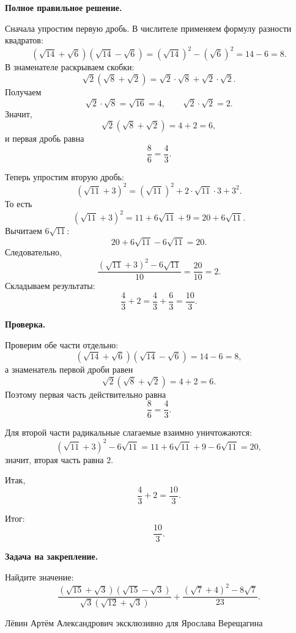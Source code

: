 \documentclass[12pt,a4paper]{article}
\begin{document}
\textbf{Полное правильное решение.}

Сначала упростим первую дробь. В числителе применяем формулу разности квадратов:
\[
(\sqrt{14}+\sqrt6)(\sqrt{14}-\sqrt6)
=
(\sqrt{14})^2-(\sqrt6)^2
=
14-6
=
8.
\]
В знаменателе раскрываем скобки:
\[
\sqrt2(\sqrt8+\sqrt2)
=
\sqrt2\cdot\sqrt8+\sqrt2\cdot\sqrt2.
\]
Получаем
\[
\sqrt2\cdot\sqrt8=\sqrt{16}=4,
\qquad
\sqrt2\cdot\sqrt2=2.
\]
Значит,
\[
\sqrt2(\sqrt8+\sqrt2)=4+2=6,
\]
и первая дробь равна
\[
\frac86=\frac43.
\]

Теперь упростим вторую дробь:
\[
(\sqrt{11}+3)^2
=
(\sqrt{11})^2+2\cdot\sqrt{11}\cdot3+3^2.
\]
То есть
\[
(\sqrt{11}+3)^2
=
11+6\sqrt{11}+9
=
20+6\sqrt{11}.
\]
Вычитаем $6\sqrt{11}$:
\[
20+6\sqrt{11}-6\sqrt{11}=20.
\]
Следовательно,
\[
\frac{(\sqrt{11}+3)^2-6\sqrt{11}}{10}
=
\frac{20}{10}
=
2.
\]
Складываем результаты:
\[
\frac43+2
=
\frac43+\frac63
=
\frac{10}{3}.
\]

\textbf{Проверка.}

Проверим обе части отдельно:
\[
(\sqrt{14}+\sqrt6)(\sqrt{14}-\sqrt6)=14-6=8,
\]
а знаменатель первой дроби равен
\[
\sqrt2(\sqrt8+\sqrt2)=4+2=6.
\]
Поэтому первая часть действительно равна
\[
\frac86=\frac43.
\]

Для второй части радикальные слагаемые взаимно уничтожаются:
\[
(\sqrt{11}+3)^2-6\sqrt{11}
=
11+6\sqrt{11}+9-6\sqrt{11}
=
20,
\]
значит, вторая часть равна $2$.

Итак,
\[
\frac43+2=\frac{10}{3}.
\]

\textcolor{teal!60!black}{Итог:}
\[
\boxed{\frac{10}{3}}.
\]

\textbf{Задача на закрепление.}

Найдите значение:
\[
\frac{(\sqrt{15}+\sqrt3)(\sqrt{15}-\sqrt3)}
{\sqrt3(\sqrt{12}+\sqrt3)}
+
\frac{(\sqrt7+4)^2-8\sqrt7}{23}.
\]

\vfill
\begin{center}
\small Лёвин Артём Александрович эксклюзивно для Ярослава Верещагина
\end{center}
\end{document}
